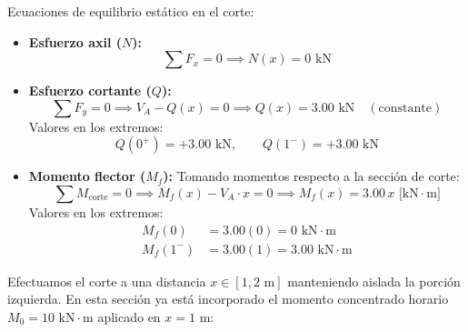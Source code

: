 Ecuaciones de equilibrio estático en el corte:
\begin{itemize}
    \item \textbf{Esfuerzo axil ($N$):}
          \begin{equation}
              \sum F_x = 0 \implies \boxed{N(x) = 0\text{ kN}}
          \end{equation}

    \item \textbf{Esfuerzo cortante ($Q$):}
          \begin{equation}
              \sum F_y = 0 \implies V_A - Q(x) = 0 \implies \boxed{Q(x) = 3.00\text{ kN}} \quad (\text{constante})
          \end{equation}
          Valores en los extremos:
          \begin{equation*}
              Q(0^+) = +3.00\text{ kN}, \qquad Q(1^-) = +3.00\text{ kN}
          \end{equation*}

    \item \textbf{Momento flector ($M_f$):}
          Tomando momentos respecto a la sección de corte:
          \begin{equation}
              \sum M_{\text{corte}} = 0 \implies M_f(x) - V_A \cdot x = 0 \implies \boxed{M_f(x) = 3.00\,x\text{ [kN}\cdot\text{m]}}
          \end{equation}
          Valores en los extremos:
          \begin{align*}
              M_f(0)   & = 3.00(0) = \boxed{0\text{ kN}\cdot\text{m}}    \\
              M_f(1^-) & = 3.00(1) = \boxed{3.00\text{ kN}\cdot\text{m}}
          \end{align*}
\end{itemize}


Efectuamos el corte a una distancia $x \in [1, 2\text{ m}]$ manteniendo aislada la porción izquierda. En esta sección ya está incorporado el momento concentrado horario $M_0 = 10\text{ kN}\cdot\text{m}$ aplicado en $x = 1\text{ m}$:

